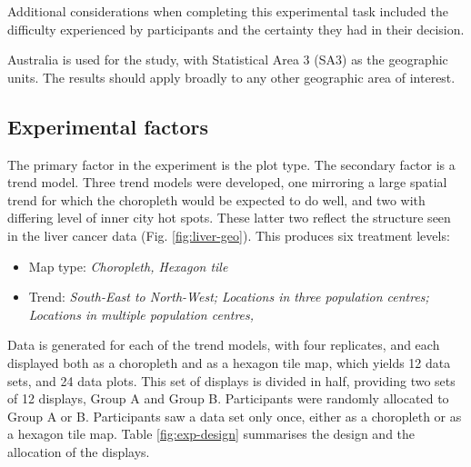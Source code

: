 \documentclass{monashthesis}
\begin{document}
Additional considerations when completing this experimental task included the difficulty experienced by participants and the certainty they had in their decision.

Australia is used for the study, with Statistical Area 3 (SA3) \autocite{abs2016} as the geographic units. The results should apply broadly to any other geographic area of interest.

\hypertarget{experimental-factors}{%
\subsection{Experimental factors}\label{experimental-factors}}

The primary factor in the experiment is the plot type. The secondary factor is a trend model. Three trend models were developed, one mirroring a large spatial trend for which the choropleth would be expected to do well, and two with differing level of inner city hot spots. These latter two reflect the structure seen in the liver cancer data (Fig. \ref{fig:liver-geo}). This produces six treatment levels:

\begin{itemize}
\tightlist
\item
  Map type: \emph{Choropleth, Hexagon tile}
\item
  Trend: \emph{South-East to North-West; Locations in three population centres; Locations in multiple population centres, }
\end{itemize}

Data is generated for each of the trend models, with four replicates, and each displayed both as a choropleth and as a hexagon tile map, which yields 12 data sets, and 24 data plots. This set of displays is divided in half, providing two sets of 12 displays, Group A and Group B. Participants were randomly allocated to Group A or B. Participants saw a data set only once, either as a choropleth or as a hexagon tile map. Table \ref{fig:exp-design} summarises the design and the allocation of the displays.
\end{document}

